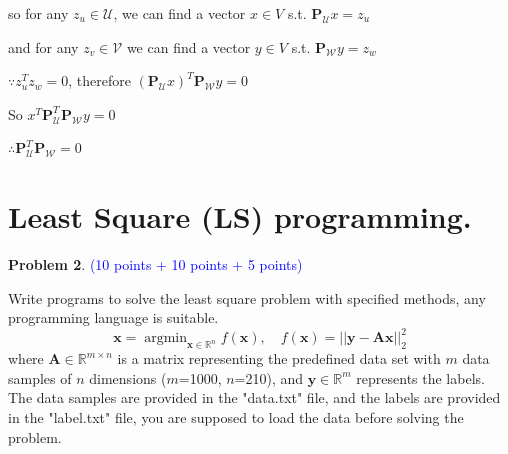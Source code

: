 \documentclass[english,onecolumn]{IEEEtran}
\newcommand{\Rbb}{\mathbb{R}}
\newcommand{\Pb}{\mathbf{P}}
\newcommand{\Ucal}{\mathcal{U}}
\newcommand{\Wcal}{\mathcal{W}}
\newcommand{\Vcal}{\mathcal{V}}
\begin{document}
\begin{enumerate}
	so for any $z_{u} \in \mathcal{U}$, we can find a vector $x \in V$ s.t. $\Pb_{\Ucal} x = z_u$ 
	
	and for any $z_{v} \in \mathcal{V}$ we can find a vector $y \in V$ s.t. $\Pb_{\Wcal} y = z_w$ 
	
	$\because z_u^T z_w = 0$, therefore $(\Pb_{\Ucal} x)^T \Pb_{\Wcal} y = 0$
	
	So $x^T \Pb_{\Ucal}^T \Pb_{\Wcal} y = 0$ 
	
	$\therefore \Pb_{\Ucal}^T \Pb_{\Wcal} = 0$ 


\end{enumerate}

\newpage
\section{Least Square (LS) programming.}
\noindent\textbf{Problem 2}. \textcolor{blue}{(10 points + 10 points + 5 points)}

Write programs to solve the least square problem with specified methods, any programming language is suitable.
$$
\mathbf{x} = \mathop{\arg\min}_{\mathbf{x} \in \Rbb^n} f(\mathbf{x}), \quad f(\mathbf{x}) = ||\mathbf{y}-\mathbf{A}\mathbf{x}||_2^2
$$
where $\mathbf{A} \in \Rbb^{m \times n}$ is a matrix representing the predefined data set with $m$ data samples of $n$ dimensions ($m$=1000, $n$=210), and $\mathbf{y} \in \Rbb^m$ represents the labels. The data samples are provided in the "data.txt" file, and the labels are provided in the "label.txt" file, you are supposed to load the data before solving the problem.
\end{document}
